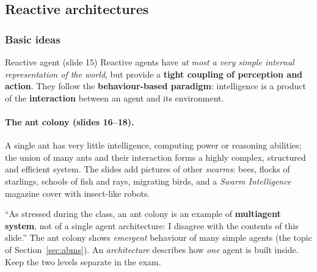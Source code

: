 \subsection{Reactive architectures}
\label{sec:reactive-architectures}

\subsubsection{Basic ideas}

\begin{nbdef}{Reactive agent (slide 15)}
Reactive agents have \emph{at most a very simple internal representation of the world},
but provide a \textbf{tight coupling of perception and action}. They follow the
\textbf{behaviour-based paradigm}: intelligence is a product of the \textbf{interaction}
between an agent and its environment.
\end{nbdef}

\paragraph{The ant colony (slides 16--18).} A single ant has very little intelligence,
computing power or reasoning abilities; the union of many ants and their interaction forms
a highly complex, structured and efficient system. The slides add pictures of other
\emph{swarms}: bees, flocks of starlings, schools of fish and rays, migrating birds, and a
\emph{Swarm Intelligence} magazine cover with insect-like robots.

\begin{nbwarning}
``As stressed during the class, an ant colony is an example of \textbf{multiagent system},
not of a single agent architecture: I disagree with the contents of this slide.''
The ant colony shows \emph{emergent} behaviour of many simple agents (the topic of
Section~\ref{sec:abms}). An \emph{architecture} describes how \emph{one} agent is built inside.
Keep the two levels separate in the exam.
\end{nbwarning}

